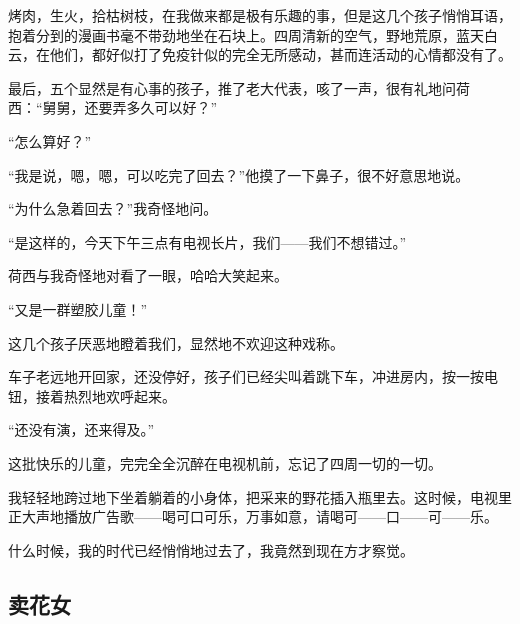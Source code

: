 \par 烤肉，生火，拾枯树枝，在我做来都是极有乐趣的事，但是这几个孩子悄悄耳语，抱着分到的漫画书毫不带劲地坐在石块上。四周清新的空气，野地荒原，蓝天白云，在他们，都好似打了免疫针似的完全无所感动，甚而连活动的心情都没有了。
\par 最后，五个显然是有心事的孩子，推了老大代表，咳了一声，很有礼地问荷西：“舅舅，还要弄多久可以好？”
\par “怎么算好？”
\par “我是说，嗯，嗯，可以吃完了回去？”他摸了一下鼻子，很不好意思地说。
\par “为什么急着回去？”我奇怪地问。
\par “是这样的，今天下午三点有电视长片，我们——我们不想错过。”
\par 荷西与我奇怪地对看了一眼，哈哈大笑起来。
\par “又是一群塑胶儿童！”
\par 这几个孩子厌恶地瞪着我们，显然地不欢迎这种戏称。
\par 车子老远地开回家，还没停好，孩子们已经尖叫着跳下车，冲进房内，按一按电钮，接着热烈地欢呼起来。
\par “还没有演，还来得及。”
\par 这批快乐的儿童，完完全全沉醉在电视机前，忘记了四周一切的一切。
\par 我轻轻地跨过地下坐着躺着的小身体，把采来的野花插入瓶里去。这时候，电视里正大声地播放广告歌——喝可口可乐，万事如意，请喝可——口——可——乐。
\par 什么时候，我的时代已经悄悄地过去了，我竟然到现在方才察觉。


\subsection{卖花女}

